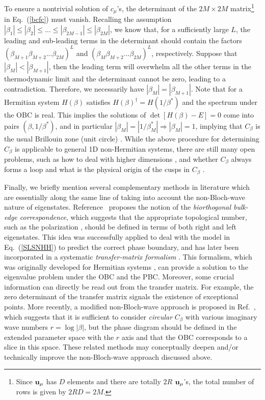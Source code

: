 \documentclass{tADP2e}
\theoremstyle{plain}
\theoremstyle{plain}
\theoremstyle{definition}
\begin{document}
To ensure a nontrivial solution of $c_\mu$'s, the determinant of the $2M\times 2M$ matrix\footnote{Since $\bold{u}_\mu$ has $D$ elements and there are totally $2R$ $\bold{u}_\mu$'s, the total number of rows is given by $2RD=2M$.} in Eq.~(\ref{bcfc}) must vanish. Recalling the assumption $|\beta_1|\le|\beta_2|\le ...\le|\beta_{2M-1}|\le|\beta_{2M}|$, we know that, for a sufficiently large $L$, the leading and sub-leading terms in the determinant should contain the factors $(\beta_{M+1}\beta_{M+2}...\beta_{2M})^L$ and $(\beta_{M}\beta_{M+2}...\beta_{2M})^L$, respectively. Suppose that $|\beta_M|<|\beta_{M+1}|$, then the leading term will overwhelm all the other terms in the thermodynamic limit and the determinant cannot be zero, leading to a contradiction. Therefore, we necessarily have $|\beta_M|=|\beta_{M+1}|$. Note that for a Hermitian system $H(\beta)$ satisfies $H(\beta)^\dag=H(1/\beta^*)$ and the spectrum under the OBC is real. This implies the solutions of $\det[H(\beta)-E]=0$ come into pairs $(\beta,1/\beta^*)$, and in particular $|\beta_M|=|1/\beta_M^*|\Rightarrow |\beta_M|=1$, implying that $C_\beta$ is the usual Brillouin zone (unit circle) \cite{KY19}. While the above procedure for determining $C_\beta$ is applicable to general 1D non-Hermitian systems, there are still many open problems, such as how to deal with %
higher dimensions \cite{YS18b}, and whether $C_\beta$ always forms a loop and what is the physical origin of the cusps in $C_\beta$ \cite{KY19}.

Finally, we briefly mention several complementary methods in  literature which are essentially along the same line of taking into account the non-Bloch-wave nature of eigenstates. Reference~\cite{KFK18} proposes the notion of the \emph{biorthogonal bulk-edge correspondence}, which suggests that the appropriate topological number, such as the polarization \cite{VD93}, should be defined in terms of both right and left eigenstates. This idea was successfully applied to deal with the model in Eq.~(\ref{SLSNHH}) to predict the correct phase boundary, and has later been incorporated in a systematic \emph{transfer-matrix formalism} \cite{KFK19}. This formalism, which was originally developed for Hermitian systems \cite{DV16}, can provide a solution to the eigenvalue problem under the OBC and the PBC. Moreover, some crucial information can directly be read out from the transfer matrix. For example, the zero determinant of the transfer matrix signals the existence of exceptional points.
 More recently, a modified non-Bloch-wave approach is proposed in Ref.~\cite{KII19}, which suggests that it is sufficient to consider \emph{circular} $C_\beta$ with various imaginary wave numbers $r=\log|\beta|$, but the phase diagram should be defined in the extended parameter space with the $r$ axis and that the OBC corresponds to a slice in this space. These related methods may conceptually  deepen and/or technically improve the non-Bloch-wave approach discussed above.
\end{document}
